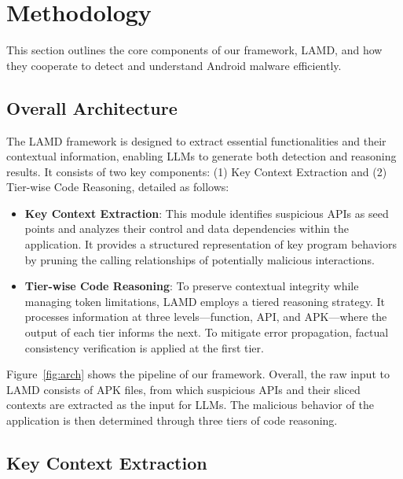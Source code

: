 
\section{Methodology}
This section outlines the core components of our framework, LAMD, and how they cooperate to detect and understand Android malware efficiently.

\subsection{Overall Architecture}
The LAMD framework is designed to extract essential functionalities and their contextual information, enabling LLMs to generate both detection and reasoning results. It consists of two key components: (1) Key Context Extraction and (2) Tier-wise Code Reasoning, detailed as follows:
\begin{itemize}
    \item \textbf{Key Context Extraction}: This module identifies suspicious APIs as seed points and analyzes their control and data dependencies within the application. It provides a structured representation of key program behaviors by pruning the calling relationships of potentially malicious interactions.
    \item \textbf{Tier-wise Code Reasoning}: To preserve contextual integrity while managing token limitations, LAMD employs a tiered reasoning strategy. It processes information at three levels—function, API, and APK—where the output of each tier informs the next. To mitigate error propagation, factual consistency verification is applied at the first tier.
\end{itemize}
Figure~\ref{fig:arch} shows the pipeline of our framework. Overall, the raw input to LAMD consists of APK files, from which suspicious APIs and their sliced contexts are extracted as the input for LLMs. The malicious behavior of the application is then determined through three tiers of code reasoning.

\subsection{Key Context Extraction}

